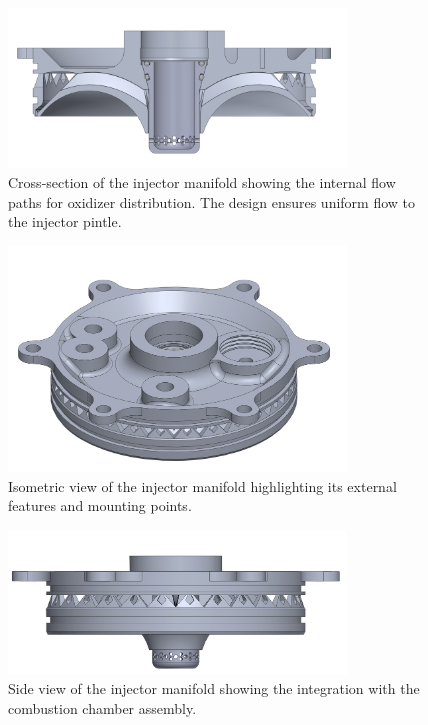 \begin{figure}[H]
    \centering
    \includegraphics[width=0.8\textwidth]{Images/ManifoldCrossSection.png}
    \caption{Cross-section of the injector manifold showing the internal flow paths for oxidizer distribution. The design ensures uniform flow to the injector pintle.}
    \label{fig:manifold_crosssection}
\end{figure}
\begin{figure}[H]
    \centering
    \includegraphics[width=0.8\textwidth]{Images/InjectorManifoldIsoView.png}
    \caption{Isometric view of the injector manifold highlighting its external features and mounting points.}
    \label{fig:manifold_isoview}
\end{figure}

\begin{figure}[H]
    \centering
    \includegraphics[width=0.8\textwidth]{Images/InjectorManifoldSideView.png}
    \caption{Side view of the injector manifold showing the integration with the combustion chamber assembly.}
    \label{fig:manifold_sideview}
\end{figure}


